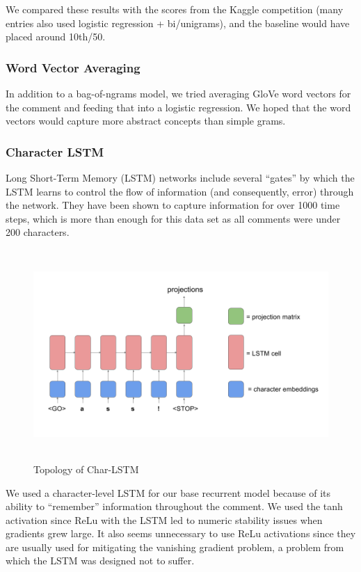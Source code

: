 \documentclass{article} %
\begin{document}
We compared these results with the scores from the Kaggle competition (many entries also used logistic regression + bi/unigrams), and the baseline would have placed around 10th/50.

\subsubsection*{Word Vector Averaging}
In addition to a bag-of-ngrams model, we tried averaging GloVe word vectors for the comment and feeding that into a logistic regression. We hoped that the word vectors would capture more abstract concepts than simple grams. 

\subsubsection*{Character LSTM}
Long Short-Term Memory (LSTM) networks include several ``gates'' by which the LSTM learns to control the flow of information (and consequently, error) through the network. They have been shown to capture information for over 1000 time steps, which is more than enough for this data set as all comments were under 200 characters.

 
\begin{figure}[H]
\begin{center}
\label{network-topology}
\vspace*{-0.3cm}
\caption{Topology of Char-LSTM}
\vspace*{-0.3cm}
\hspace*{-0.65cm}
\includegraphics[width=15cm, height=8cm]{Network_Diagram.png}
\end{center}
\end{figure}
\vspace*{-1.3cm}
We used a character-level LSTM for our base recurrent model because of its ability to ``remember'' information throughout the comment. We used the tanh activation since ReLu with the LSTM led to numeric stability issues when gradients grew large. It also seems unnecessary to use ReLu activations since they are usually used for mitigating the vanishing gradient problem, a problem from which the LSTM was designed not to suffer. 
\end{document}
